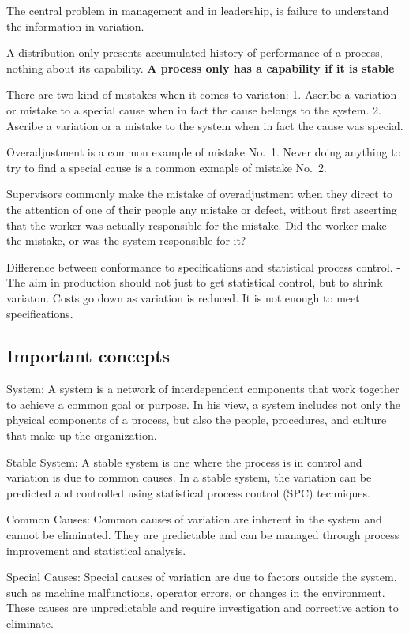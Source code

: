 \documentclass[11pt]{article}
\begin{document}
The central problem in management and in leadership, is failure to
understand the information in variation.

A distribution only presents accumulated history of performance of a
process, nothing about its capability. \textbf{A process only has a
capability if it is stable}

There are two kind of mistakes when it comes to variaton: 1. Ascribe a
variation or mistake to a special cause when in fact the cause belongs
to the system. 2. Ascribe a variation or a mistake to the system when in
fact the cause was special.

Overadjustment is a common example of mistake No.~1. Never doing
anything to try to find a special cause is a common exmaple of mistake
No.~2.

Supervisors commonly make the mistake of overadjustment when they direct
to the attention of one of their people any mistake or defect, without
first ascerting that the worker was actually responsible for the
mistake. Did the worker make the mistake, or was the system responsible
for it?

Difference between conformance to specifications and statistical process
control. - The aim in production should not just to get statistical
control, but to shrink variaton. Costs go down as variation is reduced.
It is not enough to meet specifications.

\hypertarget{important-concepts}{%
\subsection{Important concepts}\label{important-concepts}}

System: A system is a network of interdependent components that work
together to achieve a common goal or purpose. In his view, a system
includes not only the physical components of a process, but also the
people, procedures, and culture that make up the organization.

Stable System: A stable system is one where the process is in control
and variation is due to common causes. In a stable system, the variation
can be predicted and controlled using statistical process control (SPC)
techniques.

Common Causes: Common causes of variation are inherent in the system and
cannot be eliminated. They are predictable and can be managed through
process improvement and statistical analysis.

Special Causes: Special causes of variation are due to factors outside
the system, such as machine malfunctions, operator errors, or changes in
the environment. These causes are unpredictable and require
investigation and corrective action to eliminate.
\end{document}
